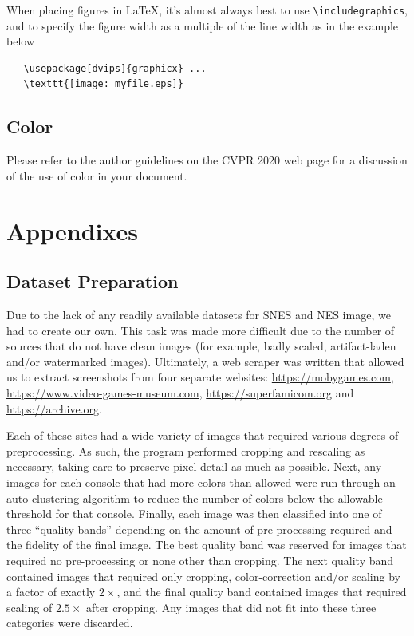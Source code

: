 \documentclass[10pt,twocolumn,letterpaper]{article}
\begin{document}
When placing figures in \LaTeX, it's almost always best to use
\verb+\includegraphics+, and to specify the  figure width as a multiple of
the line width as in the example below
   {\small\begin{verbatim}
   \usepackage[dvips]{graphicx} ...
   \texttt{[image: myfile.eps]}
\end{verbatim}
   }


\subsection{Color}

Please refer to the author guidelines on the CVPR 2020 web page for a discussion
of the use of color in your document.

\section{Appendixes}
\subsection{Dataset Preparation}
Due to the lack of any readily available datasets for SNES and NES image, we had to create our own.
This task was made more difficult due to the number of sources that do not have clean images (for example, badly scaled, artifact-laden and/or watermarked images).
Ultimately, a web scraper was written that allowed us to extract screenshots from four separate websites: \url{https://mobygames.com}, \url{https://www.video-games-museum.com}, \url{https://superfamicom.org} and \url{https://archive.org}.

Each of these sites had a wide variety of images that required various degrees of preprocessing. As such, the program performed cropping and rescaling as necessary, taking care to preserve pixel detail as much as possible.
Next, any images for each console that had more colors than allowed were run through an auto-clustering algorithm to reduce the number of colors below the allowable threshold for that console.
Finally, each image was then classified into one of three ``quality bands'' depending on the amount of pre-processing required and the fidelity of the final image. The best quality band was reserved for images that required no pre-processing or none other than cropping. The next quality band contained images that  required only cropping, color-correction and/or scaling by a factor of exactly $2\times$, and the final quality band contained images that required scaling of $2.5\times$ after cropping. Any images that did not fit into these three categories were discarded.
\end{document}
